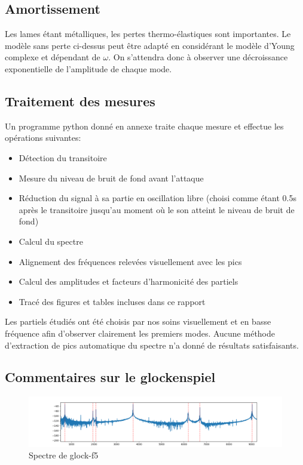 \documentclass[atiam, article]{rapport} %
\begin{document}
\subsection{Amortissement}

Les lames étant métalliques, les pertes thermo-élastiques sont importantes. Le modèle sans perte ci-dessus peut être adapté en considérant le modèle d'Young complexe et dépendant de $\omega$. On s'attendra donc à observer une décroissance exponentielle de l'amplitude de chaque mode.

\subsection{Traitement des mesures}

Un programme python donné en annexe traite chaque mesure et effectue les opérations suivantes:
\begin{itemize}
  \item Détection du transitoire
  \item Mesure du niveau de bruit de fond avant l'attaque
  \item Réduction du signal à sa partie en oscillation libre (choisi comme étant 0.5s après le transitoire jusqu'au moment où le son atteint le niveau de bruit de fond)
  \item Calcul du spectre
  \item Alignement des fréquences relevées visuellement avec les pics
  \item Calcul des amplitudes et facteurs d'harmonicité des partiels
  \item Tracé des figures et tables incluses dans ce rapport
\end{itemize}

Les partiels étudiés ont été choisis par nos soins visuellement et en basse fréquence afin d'observer clairement les premiers modes. Aucune méthode d'extraction de pics automatique du spectre n'a donné de résultats satisfaisants.

\subsection{Commentaires sur le glockenspiel}

\begin{figure}
  \begin{center}
      \includegraphics[width=\textwidth]{percu/glock-f5.wav.spectre.png}
  \end{center}
  \caption{Spectre de glock-f5}
  \label{fig:spectre-glock-f5.wav}
\end{figure}

\end{document}
